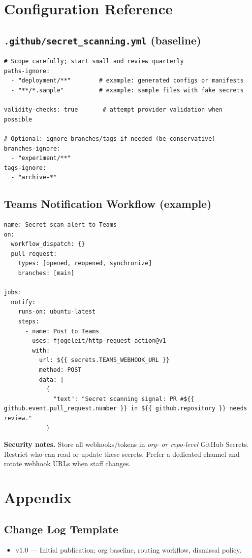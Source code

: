 \documentclass[11pt,a4paper]{article}
\begin{document}
\section{Configuration Reference}
\subsection{\texttt{.github/secret\_scanning.yml} (baseline)}
\begin{listing}[h]
\caption{\texttt{.github/secret\_scanning.yml} baseline}\label{lst:secret-yaml}
\begin{verbatim}
# Scope carefully; start small and review quarterly
paths-ignore:
  - "deployment/**"        # example: generated configs or manifests
  - "**/*.sample"          # example: sample files with fake secrets

validity-checks: true       # attempt provider validation when possible

# Optional: ignore branches/tags if needed (be conservative)
branches-ignore:
  - "experiment/**"
tags-ignore:
  - "archive-*"
\end{verbatim}
\end{listing}

\subsection{Teams Notification Workflow (example)}
\begin{listing}[h]
\caption{GitHub Actions workflow: Post signal to Microsoft Teams}
\label{lst:teams-workflow}
\begin{verbatim}
name: Secret scan alert to Teams
on:
  workflow_dispatch: {}
  pull_request:
    types: [opened, reopened, synchronize]
    branches: [main]

jobs:
  notify:
    runs-on: ubuntu-latest
    steps:
      - name: Post to Teams
        uses: fjogeleit/http-request-action@v1
        with:
          url: ${{ secrets.TEAMS_WEBHOOK_URL }}
          method: POST
          data: |
            {
              "text": "Secret scanning signal: PR #${{ github.event.pull_request.number }} in ${{ github.repository }} needs review."
            }
\end{verbatim}
\end{listing}

\begin{tcolorbox}
\textbf{Security notes.} Store all webhooks/tokens in \emph{org- or repo-level} GitHub Secrets. Restrict who can read or update these secrets. Prefer a dedicated channel and rotate webhook URLs when staff changes.
\end{tcolorbox}

\section{Appendix}
\subsection*{Change Log Template}
\begin{itemize}
  \item v1.0 --- Initial publication; org baseline, routing workflow, dismissal policy.
\end{itemize}
\end{document}

